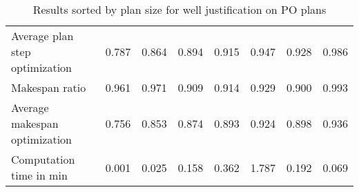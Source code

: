\begin{table}[b]
\begin{tabular}{llllllll}
Average plan step optimization & 0.787           & 0.864            & 0.894            & 0.915            & 0.947            & 0.928            & 0.986            \\
Makespan ratio                 & 0.961           & 0.971            & 0.909            & 0.914            & 0.929            & 0.900            & 0.993            \\
Average makespan optimization  & 0.756           & 0.853            & 0.874            & 0.893            & 0.924            & 0.898            & 0.936            \\
Computation time in min        & 0.001           & 0.025            & 0.158            & 0.362            & 1.787            & 0.192            & 0.069           
\end{tabular}
\caption{Results sorted by plan size for well justification on PO plans}
\end{table}


